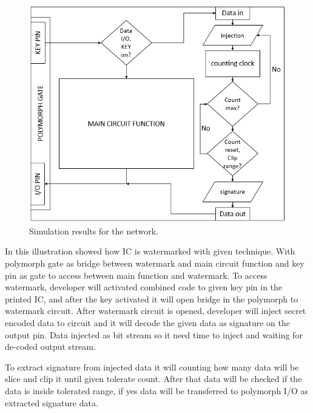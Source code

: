 \documentclass[10pt,journal,compsoc,letterpaper,final]{IEEEtran}
\begin{document}
\begin{figure}
	\centering
	\includegraphics[scale=0.4]{images/flow}
	\caption{Simulation results for the network.}
	\label{fig_sim}
\end{figure}

In this illustration showed how IC is watermarked with given technique. With polymorph gate as bridge between watermark and main circuit function and key pin as gate to access between main function and watermark. To access watermark, developer will activated combined code to given key pin in the printed IC, and after the key activated it will open bridge in the polymorph to watermark circuit. After watermark circuit is opened, developer will inject secret encoded data to circuit and it will decode the given data as signature on the output pin. Data injected as bit stream so it need time to inject and waiting for de-coded output stream.

To extract signature from injected data it will counting how many data will be slice and clip it until given tolerate count. After that data will be checked if the data is inside tolerated range, if yes data will be transferred to polymorph I/O as extracted signature data.
\end{document}
